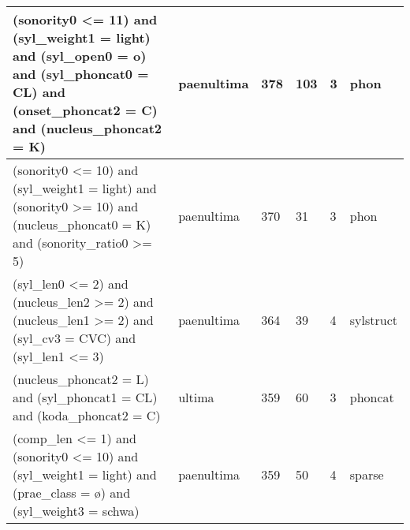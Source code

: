 \begin{table}
\begin{tabular}{|p{8cm}l|ll|ll|}
(sonority0 \textless= 11) and (syl\_weight1 = light) and (syl\_open0 = o) and (syl\_phoncat0 = CL) and (onset\_phoncat2 = C) and (nucleus\_phoncat2 = K)                                                                                                    & paenultima     & 378 & 103 & 3 & phon      \\\hline
(sonority0 \textless= 10) and (syl\_weight1 = light) and (sonority0 \textgreater= 10) and (nucleus\_phoncat0 = K) and (sonority\_ratio0 \textgreater= 5)                                                                                                    & paenultima     & 370 & 31  & 3 & phon      \\\hline
(syl\_len0 \textless= 2) and (nucleus\_len2 \textgreater= 2) and (nucleus\_len1 \textgreater= 2) and (syl\_cv3 = CVC) and (syl\_len1 \textless= 3)                                                                                                          & paenultima     & 364 & 39  & 4 & sylstruct \\\hline
(nucleus\_phoncat2 = L) and (syl\_phoncat1 = CL) and (koda\_phoncat2 = C)                                                                                                                                                                                   & ultima         & 359 & 60  & 3 & phoncat   \\\hline
(comp\_len \textless= 1) and (sonority0 \textless= 10) and (syl\_weight1 = light) and (prae\_class = ø) and (syl\_weight3 = schwa)                                                                                                                          & paenultima     & 359 & 50  & 4 & sparse    \\\hline
\end{tabular}
\end{table}